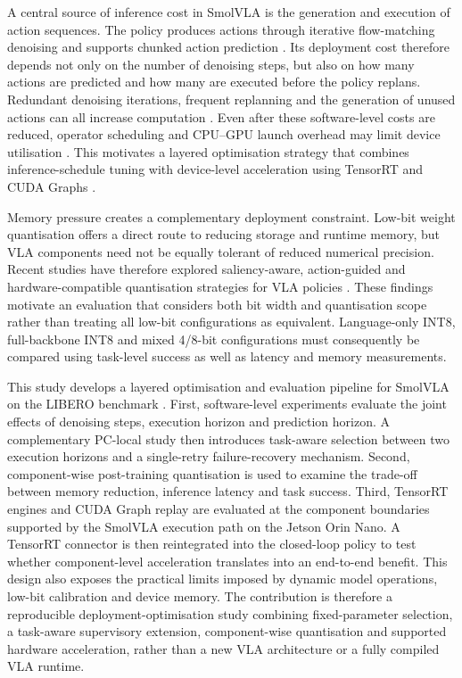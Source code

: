 A central source of inference cost in SmolVLA is the generation and execution of action sequences. The policy produces actions through iterative flow-matching denoising and supports chunked action prediction \cite{smolvla}. Its deployment cost therefore depends not only on the number of denoising steps, but also on how many actions are predicted and how many are executed before the policy replans. Redundant denoising iterations, frequent replanning and the generation of unused actions can all increase computation \cite{snapflow}. Even after these software-level costs are reduced, operator scheduling and CPU--GPU launch overhead may limit device utilisation \cite{opara}. This motivates a layered optimisation strategy that combines inference-schedule tuning with device-level acceleration using TensorRT and CUDA Graphs \cite{nvidia_tensorrt,nvidia_cuda_graphs}.

Memory pressure creates a complementary deployment constraint. Low-bit weight quantisation offers a direct route to reducing storage and runtime memory, but VLA components need not be equally tolerant of reduced numerical precision. Recent studies have therefore explored saliency-aware, action-guided and hardware-compatible quantisation strategies for VLA policies \cite{sqil,actquant,litevlaedge}. These findings motivate an evaluation that considers both bit width and quantisation scope rather than treating all low-bit configurations as equivalent. Language-only INT8, full-backbone INT8 and mixed 4/8-bit configurations must consequently be compared using task-level success as well as latency and memory measurements.

This study develops a layered optimisation and evaluation pipeline for SmolVLA on the LIBERO benchmark \cite{smolvla,libero}. First, software-level experiments evaluate the joint effects of denoising steps, execution horizon and prediction horizon. A complementary PC-local study then introduces task-aware selection between two execution horizons and a single-retry failure-recovery mechanism. Second, component-wise post-training quantisation is used to examine the trade-off between memory reduction, inference latency and task success. Third, TensorRT engines and CUDA Graph replay are evaluated at the component boundaries supported by the SmolVLA execution path on the Jetson Orin Nano. A TensorRT connector is then reintegrated into the closed-loop policy to test whether component-level acceleration translates into an end-to-end benefit. This design also exposes the practical limits imposed by dynamic model operations, low-bit calibration and device memory. The contribution is therefore a reproducible deployment-optimisation study combining fixed-parameter selection, a task-aware supervisory extension, component-wise quantisation and supported hardware acceleration, rather than a new VLA architecture or a fully compiled VLA runtime.

